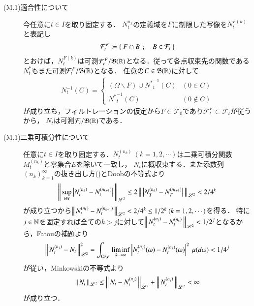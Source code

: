 \begin{prf}
\begin{description}
			\item[(M.1)適合性について]
				今任意に$t \in I$を取り固定する．
				$N^{n_k}_t$の定義域を$F$に制限した写像を$N^{F(k)}_t$と表記し
				\begin{align}
					\mathcal{F}^F_t \coloneqq \left\{\ F \cap B\ \, ; \quad B \in \mathcal{F}_t\ \right\}
				\end{align}
				とおけば，$N^{F(k)}_t$は可測$\mathcal{F}^F_t/\mathfrak{B}(\mathbb{R})$となる．従って各点収束先の関数である$N^*_t$もまた可測$\mathcal{F}^F_t/\mathfrak{B}(\mathbb{R})$となる．
				任意の$C \in \mathfrak{B}(\mathbb{R})$に対して
				\begin{align}
					N^{-1}_t(C) = 
					\begin{cases}
						(\Omega \backslash F) \cup {N^*}^{-1}_t(C) & (0 \in C) \\
						{N^*}^{-1}_t(C) & (0 \notin C)
					\end{cases}
				\end{align}
				が成り立ち，フィルトレーションの仮定から$F \in \mathcal{F}_0$であり$\mathcal{F}^F_t \subset \mathcal{F}_t$が従うから，
				$N_t$は可測$\mathcal{F}_t/\mathfrak{B}(\mathbb{R})$である．
			
			\item[(M.1)二乗可積分性について]
				任意に$t \in I$を取り固定する．$N^{(n_k)}_t\ (k=1,2,\cdots)$は二乗可積分関数$M^{(n_k)}_t$と零集合$E$を除いて一致し，
				$N_t$に概収束する．また添数列$(n_k)_{k=1}^{\infty}$の抜き出し方()とDoobの不等式より
				\begin{align}
					\left\|\, \operatorname*{sup}_{t \in I} \left|N^{(n_k)}_t - N^{(n_{k+1})}_t\right|\, \right\|_{\mathscr{L}^2} \leq 2 \left\|\, \left|N^{(n_k)}_T - N^{(n_{k+1})}_T\right|\, \right\|_{\mathscr{L}^2} < 2/4^k
				\end{align}
				が成り立つから$\left\|\, N^{(n_k)}_t - N^{(n_{k+1})}_t\, \right\|_{\mathscr{L}^2} < 2/4^k \leq 1/2^k \ (k=1,2,\cdots)$を得る．
				特に$j \in \mathbb{N}$を固定すれば全ての$k > j$に対して$\left\|\, N^{(n_j)}_t - N^{(n_k)}_t\, \right\|_{\mathscr{L}^2} < 1/2^j$となるから，Fatouの補題より
				\begin{align}
					\left\|\, N^{(n_j)}_t - N_t\, \right\|_{\mathscr{L}^2}^2 = \int_{\Omega \backslash F} \liminf_{k \to \infty} \left| N^{(n_j)}_t(\omega) - N^{(n_k)}_t(\omega) \right|^2\ \mu(d\omega)
					< 1/4^j
					\label{eq:M_c2_hilbert_2}
				\end{align}
				が従い，Minkowskiの不等式より
				\begin{align}
					\left\|\, N_t\, \right\|_{\mathscr{L}^2} \leq \left\|\, N_t - N^{(n_j)}_t\, \right\|_{\mathscr{L}^2} + \left\|\, N^{(n_j)}_t\, \right\|_{\mathscr{L}^2} < \infty
				\end{align}
				が成り立つ．
			

\end{description}
\end{prf}
